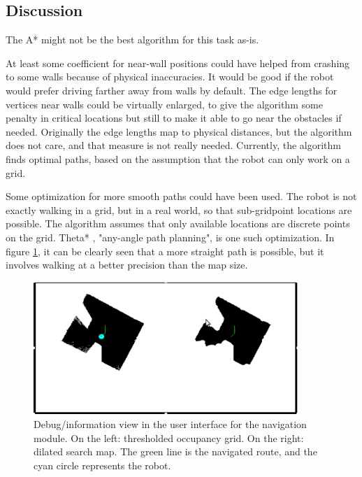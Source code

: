 \documentclass[a4paper,10pt]{article}
\begin{document}
\subsection{Discussion}

The A* might not be the best algorithm for this task as-is.

At least some coefficient for near-wall positions could have helped from crashing to some walls because of physical inaccuracies. It would be good if the robot would prefer driving farther away from walls by default. The edge lengths for vertices near walls could be virtually enlarged, to give the algorithm some penalty in critical locations but still to make it able to go near the obstacles if needed. Originally the edge lengths map to physical distances, but the algorithm does not care, and that measure is not really needed. Currently, the algorithm finds optimal paths, based on the assumption that the robot can only work on a grid.

Some optimization for more smooth paths could have been used. The robot is not exactly walking in a grid, but in a real world, so that sub-gridpoint locations are possible. The algorithm assumes that only available locations are discrete points on the grid.  Theta* \cite{nash1999theta}, "any-angle path planning", is one such optimization. In figure \ref{navi_debug_user}, it can be clearly seen that a more straight path is possible, but it involves walking at a better precision than the map size.

\begin{figure}[h]	%
\begin{center}
\includegraphics[width=10.0cm]{navi_2.eps}
\caption{Debug/information view in the user interface for the navigation module. On the left: thresholded occupancy grid. On the right: dilated search map. The green line is the navigated route, and the cyan circle represents the robot.}
\label{navi_debug_user} %
\end{center}
\end{figure}
\end{document}
